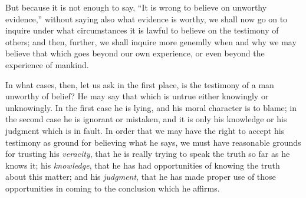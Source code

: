 \documentclass[12pt]{article}
\begin{document}
But because it is not enough to say, ``It is wrong to believe on unworthy evidence,'' without saying also what evidence is worthy, we shall now go on to inquire under what circumstances it is lawful to believe on the testimony of others; and then, further, we shall inquire more genemlly when and why we may believe that which goes beyond our own experience, or even beyond the experience of mankind.

In what cases, then, let us ask in the first place, is the testimony of a man unworthy of belief? He may say that which is untrue either knowingly or unknowingly. In the first case he is lying, and his moral character is to blame; in the second case he is ignorant or mistaken, and it is only his knowledge or his judgment which is in fault. In order that we may have the right to accept his testimony as ground for believing what he says, we must have reasonable grounds for trusting his \emph{veracity}, that he is really trying to speak the truth so far as he knows it; his \emph{knowledge}, that he has had opportunities of knowing the truth about this matter; and his \emph{judgment}, that he has made proper use of those opportunities in coming to the conclusion which he affirms.
\end{document}
